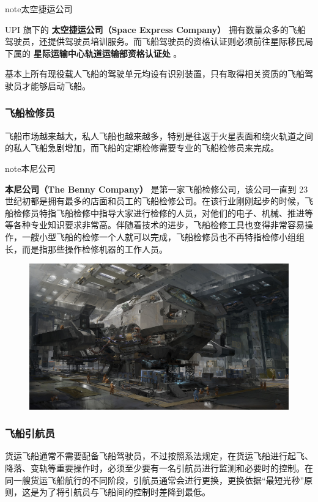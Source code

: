 \documentclass[letterpaper,10pt]{sphinxmanual}
\begin{document}
\begin{notice}{note}{太空捷运公司}

UPI 旗下的 \textbf{太空捷运公司（Space Express Company）} 拥有数量众多的飞船驾驶员，还提供驾驶员培训服务。而飞船驾驶员的资格认证则必须前往星际移民局下属的 \textbf{星际运输中心轨道运输部资格认证处} 。
\end{notice}

基本上所有现役载人飞船的驾驶单元均设有识别装置，只有取得相关资质的飞船驾驶员才能够启动飞船。


\subsubsection{飞船检修员}
\label{profession:id4}
飞船市场越来越大，私人飞船也越来越多，特别是往返于火星表面和绕火轨道之间的私人飞船急剧增加，而飞船的定期检修需要专业的飞船检修员来完成。

\begin{notice}{note}{本尼公司}

\textbf{本尼公司（The Benny Company）} 是第一家飞船检修公司，该公司一直到 23 世纪初都是拥有最多的店面和员工的飞船检修公司。在该行业刚刚起步的时候，飞船检修员特指飞船检修中指导大家进行检修的人员，对他们的电子、机械、推进等等各种专业知识要求非常高。伴随着技术的进步，飞船检修工具也变得非常容易操作，一艘小型飞船的检修一个人就可以完成，飞船检修员也不再特指检修小组组长，而是指那些操作检修机器的工作人员。
\end{notice}
\begin{figure}[htbp]
\centering

\includegraphics{330250.jpg}
\end{figure}


\subsubsection{飞船引航员}
\label{profession:id5}
货运飞船通常不需要配备飞船驾驶员，不过按照系法规定，在货运飞船进行起飞、降落、变轨等重要操作时，必须至少要有一名引航员进行监测和必要时的控制。在同一艘货运飞船航行的不同阶段，引航员通常会进行更换，更换依据“最短光秒”原则，这是为了将引航员与飞船间的控制时差降到最低。
\end{document}
